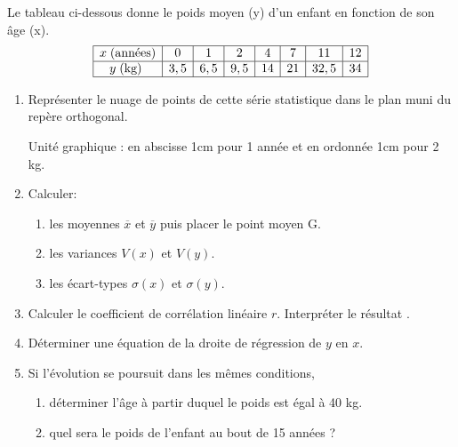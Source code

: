 \begin{exercice}

Le tableau ci-dessous donne le poids moyen (y) d'un enfant en fonction de son âge (x).
$$
\begin{array}{|c|c|c|c|c|c|c|c|c|}
 \hline
 x\; \text{(années)} &0&1&2&4&7&11&12\\ \hline
 y \;\text{(kg) } &3,5&6,5&9,5&14&21&32,5&34\\\hline
\end{array}
$$
\begin{enumerate}
\item Représenter le nuage de points de cette série statistique dans le plan muni du repère orthogonal. 
  
Unité graphique : en abscisse 1cm pour 1 année et en ordonnée 1cm pour 2 kg. 
\item Calculer:
\begin{enumerate}
\item les moyennes $ \overline{x} $ et $ \overline{y} $ puis placer le point moyen G.
\item  les variances $ V(x) $  et $ V(y) $.
\item  les écart-types $ \sigma(x) $   et $ \sigma(y) $.
\end{enumerate}
\item Calculer le coefficient de corrélation linéaire $ r $. Interpréter le résultat .
\item Déterminer une équation  de la droite   de régression de $y$ en $x$.
\item Si l'évolution se poursuit dans les mêmes conditions,
\begin{enumerate}
 \item déterminer l'âge  à partir duquel le poids est égal à 40 kg.
\item   quel sera le poids de l'enfant au bout de 15 années ?
\end{enumerate}
\end{enumerate}
\end{exercice}

